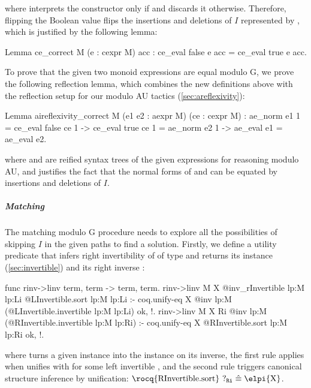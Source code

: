 \documentclass[a4paper,UKenglish,cleveref,autoref]{lipics-v2021}
\newcommand\conveq{\equiv}
\newcommand\unify{\ensuremath{\mathrel{\hat{\conveq}}}}
\newcommand\evar[1]{\ensuremath{?_{\texttt{#1}}}}
\begin{document}
where  interprets the  constructor only if  and
discards it otherwise.
Therefore, flipping the Boolean value  flips the insertions and deletions of $I$ represented
by , which is justified by the following lemma:
\begin{rocqcode}
Lemma ce_correct {M} (e : cexpr M) acc : ce_eval false e acc = ce_eval true e acc.
\end{rocqcode}
To prove that the given two monoid expressions are equal modulo G, we prove the following reflection
lemma, which combines the new definitions above with the reflection setup for our modulo AU tactics
(\cref{sec:areflexivity}):
\begin{rocqcode}
Lemma aireflexivity_correct {M} (e1 e2 : aexpr M) (ce : cexpr M) :
  ae_norm e1 1 = ce_eval false ce 1 -> ce_eval true ce 1 = ae_norm e2 1 ->
  ae_eval e1 = ae_eval e2.
\end{rocqcode}
where  and  are reified syntax trees of the given expressions for reasoning modulo
AU, and  justifies the fact that the normal forms of  and  can be equated
by insertions and deletions of $I$.

\subparagraph{Matching}
The matching modulo G procedure needs to explore all the possibilities of skipping $I$ in the given
paths to find a solution.
Firstly, we define a utility predicate  that infers right invertibility
of  of type  and returns its  instance 
(\cref{sec:invertible}) and its right inverse :
\begin{elpicode}
func rinv->linv term, term -> term, term.
rinv->linv M X {{ @inv_rInvertible lp:M lp:Li }}
               {{ @LInvertible.sort lp:M lp:Li }} :-
  coq.unify-eq X {{ @inv lp:M (@LInvertible.invertible lp:M lp:Li) }} ok, !.
rinv->linv M X Ri {{ @inv lp:M (@RInvertible.invertible lp:M lp:Ri) }} :-
  coq.unify-eq X {{ @RInvertible.sort lp:M lp:Ri }} ok, !.
\end{elpicode}
where
 turns a given  instance into the 
instance on its inverse,
the first rule applies when  unifies with  for some left invertible
, and
the second rule triggers canonical structure inference by unification:
$\text{\rocq{RInvertible.sort}} ~ \evar{Ri} \unify \text{\elpi{X}}$.
\end{document}
